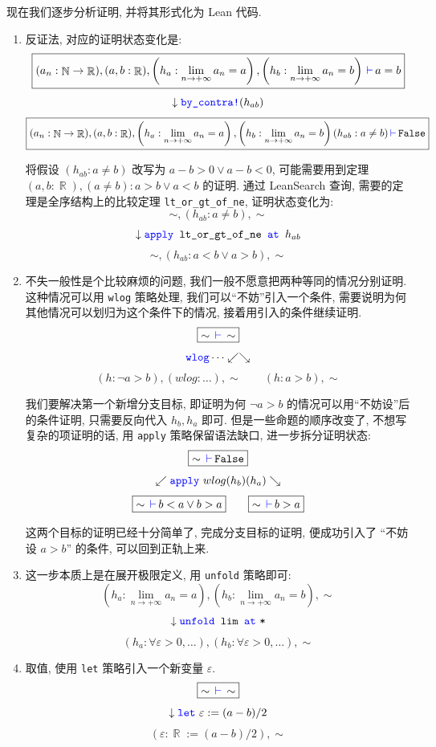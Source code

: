 \documentclass[UTF8]{ctexart}
\DeclareMathOperator{\N}{\mathbb{N}}                    %
\DeclareMathOperator{\R}{\mathbb{R}}                    %
\DeclareMathOperator{\0}{\mathbf{0}}                    %
\newcommand{\<}{\langle}
\renewcommand{\>}{\rangle}                              %
\theoremstyle{MyStyle} %
\newcommand*{\lean}[1]{\texttt{\color{blue}#1}}
\newcommand{\Goal}{\texttt{\,\color{leanblue}\ensuremath{\vdash}\,}}
\begin{document}
        现在我们逐步分析证明, 并将其形式化为 Lean 代码. 
        \begin{enumerate}
            \item 反证法, 对应的证明状态变化是: 
            \[\boxed{(a_n : \N\to\R),(a,b:\R),\left(h_a:\lim_{n\to+\infty}a_n=a\right),\left(h_b:\lim_{n\to+\infty}a_n=b\right)\Goal a=b}\]
            \[\downarrow\lean{by\_contra!}(h_{ab})\]
            \[\boxed{(a_n : \N\to\R),(a,b:\R),\left(h_a:\lim_{n\to+\infty}a_n=a\right),\left(h_b:\lim_{n\to+\infty}a_n=b\right)(h_{ab} : a\neq b)\Goal\texttt{False}}\]
            
            将假设 $(h_{ab}:a\neq b)$ 改写为 $a-b>0\lor a-b<0$, 可能需要用到定理 $(a,b:\R),(a\neq b):a>b\lor a<b$ 的证明. 通过 LeanSearch 查询, 需要的定理是全序结构上的比较定理 \texttt{lt\_or\_gt\_of\_ne}, 证明状态变化为: 
            \[\boxed{\sim,(h_{ab}:a\neq b),\sim}\]
            \[\downarrow\lean{apply }\texttt{lt\_or\_gt\_of\_ne }\lean{  at  }h_{ab}\]
            \[\boxed{\sim,(h_{ab}:a<b\lor a>b),\sim}\]
            \item 不失一般性是个比较麻烦的问题, 我们一般不愿意把两种等同的情况分别证明. 这种情况可以用 \lean{wlog} 策略处理, 我们可以``不妨''引入一个条件, 需要说明为何其他情况可以划归为这个条件下的情况, 接着用引入的条件继续证明. 
            \[\boxed{\sim\Goal\sim}\]
            \[\lean{wlog}\dots\swarrow\searrow\]
            \[\boxed{(h : \neg a > b),(wlog : \dots),\sim}\qquad \boxed{(h : a > b),\sim}\]
            
            我们要解决第一个新增分支目标, 即证明为何 $\neg a>b$ 的情况可以用``不妨设''后的条件证明, 只需要反向代入 $h_b,h_a$ 即可. 但是一些命题的顺序改变了, 不想写复杂的项证明的话, 用 \lean{apply} 策略保留语法缺口, 进一步拆分证明状态: 
            \[\boxed{\sim\Goal\texttt{False}}\]
            \[\swarrow\lean{apply}\,\,wlog(h_b)(h_a)\searrow\]
            \[\boxed{\sim\Goal b < a \lor b > a}\qquad\boxed{\sim\Goal b > a}\]

            这两个目标的证明已经十分简单了, 完成分支目标的证明, 便成功引入了 ``不妨设 $a>b$'' 的条件, 可以回到正轨上来. 
            \item 这一步本质上是在展开极限定义, 用 \lean{unfold} 策略即可: 
            \[\boxed{\left(h_a : \lim_{n\to+\infty}a_n = a\right),\left(h_b : \lim_{n\to+\infty}a_n = b\right),\sim}\]
            \[\downarrow\lean{unfold}\texttt{ lim }\lean{at}\,\,\texttt{*}\]
            \[\boxed{(h_a : \forall\varepsilon>0, \dots),(h_b : \forall\varepsilon>0,\dots),\sim}\]
            \item 取值, 使用 \lean{let} 策略引入一个新变量 $\varepsilon$. 
            \[\boxed{\sim\Goal\sim}\]
            \[\downarrow\lean{let}\,\,\varepsilon:=(a-b)/2\]
            \[\boxed{(\varepsilon:\R:=(a-b)/2),\sim}\]


\end{enumerate}
\end{document}
